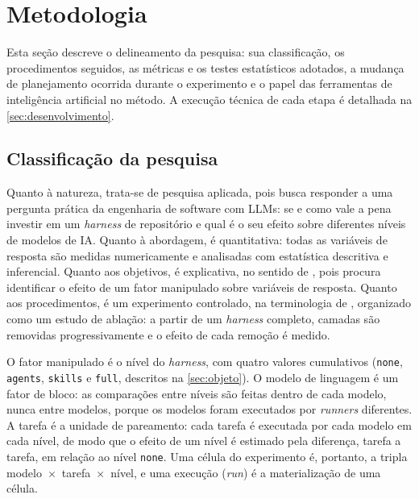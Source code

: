 
\section{Metodologia}
\label{sec:metodologia}

Esta seção descreve o delineamento da pesquisa: sua classificação, os
procedimentos seguidos, as métricas e os testes estatísticos adotados, a
mudança de planejamento ocorrida durante o experimento e o papel das
ferramentas de inteligência artificial no método. A execução técnica de cada
etapa é detalhada na \autoref{sec:desenvolvimento}.

\subsection{Classificação da pesquisa}
\label{sec:classificacao}

Quanto à natureza, trata-se de pesquisa aplicada, pois busca responder a uma
pergunta prática da engenharia de software com LLMs: se e como vale a pena
investir em um \textit{harness} de repositório e qual é o seu efeito sobre diferentes níveis de modelos de IA. Quanto à abordagem, é quantitativa: todas as variáveis de resposta são medidas numericamente e
analisadas com estatística descritiva e inferencial. Quanto aos objetivos, é
explicativa, no sentido de , pois procura identificar o
efeito de um fator manipulado sobre variáveis de resposta. Quanto aos
procedimentos, é um experimento controlado, na terminologia de
, organizado como um estudo de ablação: a partir de um
\textit{harness} completo, camadas são removidas progressivamente e o efeito de
cada remoção é medido.

O fator manipulado é o nível do \textit{harness}, com quatro valores
cumulativos (\texttt{none}, \texttt{agents}, \texttt{skills} e \texttt{full},
descritos na \autoref{sec:objeto}). O modelo de linguagem é um fator de bloco:
as comparações entre níveis são feitas dentro de cada modelo, nunca entre
modelos, porque os modelos foram executados por \textit{runners} diferentes. A
tarefa é a unidade de pareamento: cada tarefa é executada por cada modelo em
cada nível, de modo que o efeito de um nível é estimado pela diferença, tarefa a
tarefa, em relação ao nível \texttt{none}. Uma célula do experimento é,
portanto, a tripla modelo~$\times$~tarefa~$\times$~nível, e uma execução
(\textit{run}) é a materialização de uma célula.

